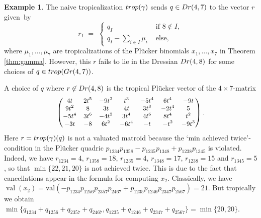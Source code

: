 \documentclass[12pt]{extarticle}
\theoremstyle{definition}
\newtheorem{example}[theorem]{Example}
\numberwithin{theorem}{section}
\theoremstyle{plain}\newtheorem{ithm}{Theorem}
\DeclareMathOperator{\val}{val}
\begin{document}
\begin{example}
  The naive tropicalization ${\rm trop}(\gamma)$ sends $q\in {\rm Dr}(4,7)$  to the vector $r$ given~by  
  $$ r_I \,\,= \,\,\begin{cases}
    q_I \quad\quad\quad\quad&\text{ if } 8\notin I, \\
    q_I - \sum_{i \in I} \mu_i &\text{ else,}
  \end{cases}$$ 
  where $\mu_1,\ldots,\mu_7$
  are tropicalizations of the Pl\"ucker binomials $x_1,\ldots,x_7$ in Theorem \ref{thm:gamma}.
However, this $r$ fails to lie in the Dressian ${\rm Dr}(4,8)$
for some choices of $q \in {\rm trop}({\rm Gr}(4,7))$.

A choice of $q$ where $r \not\in {\rm Dr}(4,8)$ is the tropical Pl\"ucker vector of the $4 \times 7$-matrix
$$ \begin{small}
    \begin{pmatrix}
      4 t   &  2 t^5&     -9 t^2 &      t^3     &  -5 t^4    & 6 t^4  &    -9 t \\
      9 t ^2&      8    &   3 t  &    4 t    & 3 t^3 &      -2 t^4 &       5  \\
      -5 t^4&     3 t^6&     -4 t^2&     3 t^4&      4 t^6&      8 t^4&       t^2   \\
      -3 t    &  -8 &    6 t^2&      -6 t^4  &   -t  &     -t^2  &    -9 t^3 
    \end{pmatrix}.
\end{small}
$$
Here $r = {\rm trop}(\gamma)(q)$ is not a valuated matroid
  because the `min achieved twice'-condition in the Pl\"ucker quadric
    $p_{1234}p_{1358} - p_{1235}p_{1348} + p_{1238}p_{1345}$  is violated.
Indeed, we have
  $r_{1234}=4$, $r_{1358}=18$, $r_{1235}=4 $, $r_{1348}=17$, $r_{1238}=15$ and $r_{1345}=5$, so that $\min\{22,21,20\}$ is not achieved twice.
  This is due to the fact that cancellations appear in the formula for computing $x_2$. Classically, we have $\val(x_2) = \text{val}(-p_{1234}p_{1256}p_{2357}p_{2467}+p_{1235}p_{1246}p_{2347}p_{2567})=21$. But tropically we obtain $\min \{ q_{1234}+q_{1256}+q_{2357}+q_{2467},q_{1235}+q_{1246}+q_{2347}+q_{2567}\} = \min\{20,20\}$.

\end{example}
\end{document}
